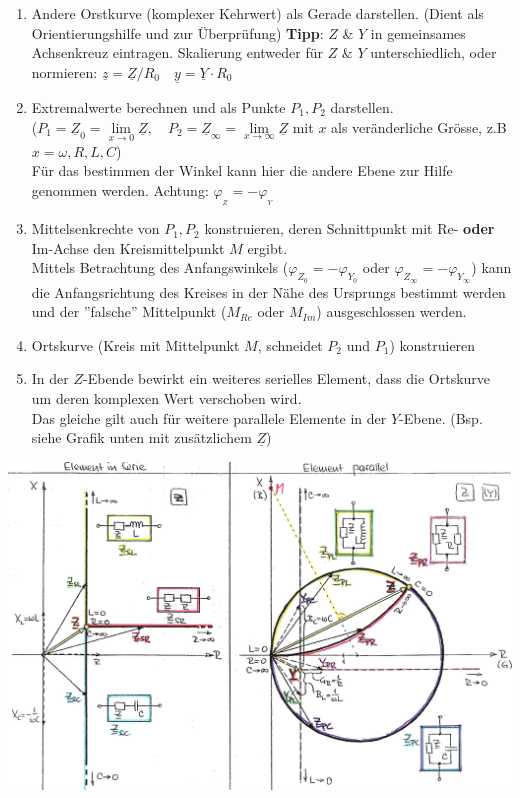 \begin{enumerate}

  \item Andere Orstkurve (komplexer Kehrwert) als Gerade darstellen. (Dient als Orientierungshilfe und zur Überprüfung)
  \textbf{Tipp}: $Z$ \& $Y$ in gemeinsames 		
  	Achsenkreuz eintragen. Skalierung entweder für $Z$ \& $Y$ unterschiedlich, oder normieren: $\underline{z} = \underline{Z} / R_0 \quad \underline{y} = \underline{Y} \cdot R_0$
  
  \item Extremalwerte berechnen und als Punkte $P_1, P_2$ darstellen. \\
	($P_1 = \underline{Z}_0 = \lim\limits_{x \rightarrow 0}\underline{Z}, \quad
	  P_2 = \underline{Z}_\infty = \lim\limits_{x \rightarrow \infty}\underline{Z} $ mit $x$ als veränderliche Grösse, z.B $x = \omega, R,L,C$)\\
	 Für das bestimmen der Winkel kann hier die andere Ebene zur Hilfe genommen werden. Achtung: $\varphi_{_Z} = -\varphi_{_Y}$
	 
  \item Mittelsenkrechte von $P_1, P_2$ konstruieren, deren Schnittpunkt mit Re- \textbf{oder}
  Im-Achse den Kreismittelpunkt $M$ ergibt. \\
  Mittels Betrachtung des Anfangswinkels ($\varphi_{Z_0} = - \varphi_{Y_0}$  oder
  $\varphi_{Z_\infty} = - \varphi_{Y_\infty}$) kann die Anfangsrichtung des Kreises in
  der Nähe des Ursprungs bestimmt werden und der ''falsche'' Mittelpunkt ($M_{Re}$ oder $M_{Im}$)
  ausgeschlossen werden.
  \item Ortskurve (Kreis mit Mittelpunkt $M$, schneidet $P_2$ und $P_1$) konstruieren
  \item In der $Z$-Ebende bewirkt ein weiteres serielles Element, dass die Ortskurve um deren komplexen Wert verschoben wird.\\
  Das gleiche gilt auch für weitere parallele Elemente in der $Y$-Ebene. (Bsp. siehe Grafik unten mit zusätzlichem $\underline{Z}$)
\end{enumerate}

\includegraphics[width=18cm]{./images/impedanztrafo.png}